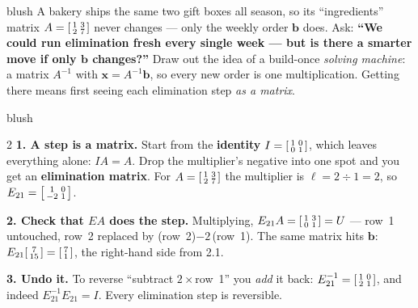 \documentclass[10pt]{article}
\newcommand{\xx}{\mathbf{x}}
\newcommand{\bb}{\mathbf{b}}
\begin{document}
\begin{skillbox}[Hook]{blush}
    A bakery ships the same two gift boxes all season, so its ``ingredients'' matrix
    $A=\begin{bsmallmatrix} 1&3\\2&7 \end{bsmallmatrix}$ never changes --- only the weekly order
    $\bb$ does. Ask: \textbf{``We could run elimination fresh every single week --- but is there a
    smarter move if only $\bb$ changes?''} Draw out the idea of a build-once \emph{solving machine}:
    a matrix $A^{-1}$ with $\xx=A^{-1}\bb$, so every new order is one multiplication. Getting there
    means first seeing each elimination step \emph{as a matrix}.
\end{skillbox}

\begin{skillbox}[Lesson]{blush}
\begin{multicols}{2}
\textbf{1. A step is a matrix.} Start from the \textbf{identity} $I=\begin{bsmallmatrix} 1&0\\0&1 \end{bsmallmatrix}$,
which leaves everything alone: $IA=A$. Drop the multiplier's negative into one spot and you get an
\textbf{elimination matrix}. For $A=\begin{bsmallmatrix} 1&3\\2&7 \end{bsmallmatrix}$ the multiplier
is $\ell=2\div1=2$, so $E_{21}=\begin{bsmallmatrix} 1&0\\-2&1 \end{bsmallmatrix}$.

\textbf{2. Check that $EA$ does the step.} Multiplying, $E_{21}A=\begin{bsmallmatrix} 1&3\\0&1 \end{bsmallmatrix}=U$
--- row~1 untouched, row~2 replaced by (row~2)$-2\,$(row~1). The same matrix hits $\bb$:
$E_{21}\begin{bsmallmatrix} 7\\15 \end{bsmallmatrix}=\begin{bsmallmatrix} 7\\1 \end{bsmallmatrix}$, the
right-hand side from 2.1.

\textbf{3. Undo it.} To reverse ``subtract $2\times$row~1'' you \emph{add} it back:
$E_{21}^{-1}=\begin{bsmallmatrix} 1&0\\2&1 \end{bsmallmatrix}$, and indeed $E_{21}^{-1}E_{21}=I$.
Every elimination step is reversible.


\end{multicols}
\end{skillbox}
\end{document}
